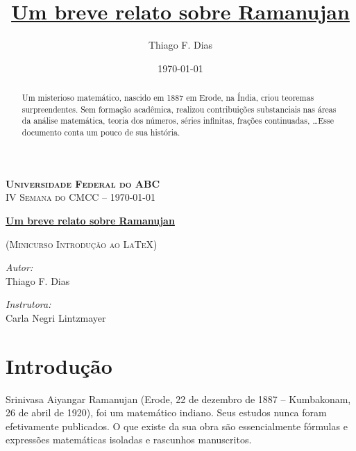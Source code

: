 \documentclass[12pt, a4paper]{article}
\author{Thiago F. Dias}
\title{\textbf{\underline{Um breve relato sobre Ramanujan}}}
\date{\today}
\begin{document}
\begin{center}
    \textsc{\bf Universidade Federal do ABC}\\
    \textsc{IV Semana do CMCC -- \today}\\[0.2cm]
    
    \hrulefill 

    \textbf{\large \underline{Um breve relato sobre Ramanujan}}
    
    \textsc{\small (Minicurso Introdução ao \LaTeX)}
    
    \hrulefill
    \vspace{0.5cm}
    
    \begin{minipage}{0.4\textwidth}
    \begin{flushleft}
    \emph{Autor:}\\
    Thiago F. Dias
    \end{flushleft}
    \end{minipage}
    \begin{minipage}{0.5\textwidth}
    \begin{flushright}
    \emph{Instrutora:} \\
    Carla Negri Lintzmayer
    \end{flushright}
    \end{minipage}
\end{center}

\begin{abstract}
\indent 
Um misterioso matemático, nascido em 1887 em Erode, na Índia, criou
teoremas surpreendentes. Sem formação acadêmica, realizou contribuições
substanciais nas áreas da análise matemática, teoria dos números, séries
infinitas, frações continuadas, \ldots Esse documento conta um pouco de 
sua história.
\end{abstract}

{\singlespacing\setlength{\parskip}{0pt} \listoffigures}
{\singlespacing\setlength{\parskip}{0pt} \listoftables}
{\singlespacing\setlength{\parskip}{0pt} \tableofcontents}

\newpage

\section{Introdução}\label{sec:intro}
\noindent 
Srinivasa Aiyangar Ramanujan (Erode, 22 de dezembro de 1887 -- Kumbakonam, 26 
de abril de 1920), foi um matemático indiano.  Seus estudos nunca foram 
efetivamente publicados.  O que existe da sua obra são essencialmente fórmulas 
e expressões matemáticas isoladas e rascunhos manuscritos.
\end{document}
